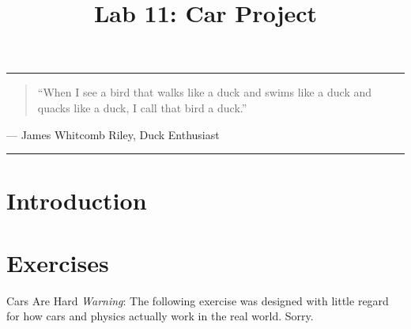 \documentclass[11pt]{cselabheader}
\title{Lab 11: Car Project}
\begin{document}
\maketitle

\hrule
\begin{quotation}
  ``When I see a bird that walks like a duck and swims like a duck and quacks like
  a duck, I call that bird a duck.''
\end{quotation}
\begin{flushright}
  --- James Whitcomb Riley, Duck Enthusiast
\end{flushright}

\hrule

\section{Introduction}


\clearpage
\section{Exercises}
\label{sec:ex}

\begin{warningbox}{Cars Are Hard}
  \emph{Warning}: The following exercise was designed with little regard for
  how cars and physics actually work in the real world. Sorry.
\end{warningbox}
\end{document}
